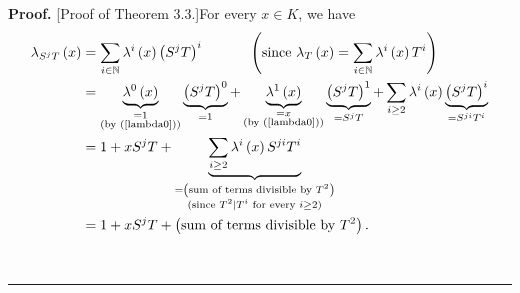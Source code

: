 \documentclass[numbers=enddot,12pt,final,onecolumn,notitlepage]{scrartcl}%
\newenvironment{proof}[1][Proof]{\noindent\textbf{#1.} }{\ \rule{0.5em}{0.5em}}
\begin{document}
\begin{proof}
[Proof of Theorem 3.3.]For every $x\in K$, we have
\begin{align}
\lambda_{S^{j}T}\left(  x\right)   &  =\sum\limits_{i\in\mathbb{N}}\lambda
^{i}\left(  x\right)  \left(  S^{j}T\right)  ^{i}\ \ \ \ \ \ \ \ \ \ \left(
\text{since }\lambda_{T}\left(  x\right)  =\sum\limits_{i\in\mathbb{N}}%
\lambda^{i}\left(  x\right)  T^{i}\right) \nonumber\\
&  =\underbrace{\lambda^{0}\left(  x\right)  }_{\substack{=1\\\text{(by
(\ref{lambda0}))}}}\underbrace{\left(  S^{j}T\right)  ^{0}}_{=1}%
+\underbrace{\lambda^{1}\left(  x\right)  }_{\substack{=x\\\text{(by
(\ref{lambda0}))}}}\underbrace{\left(  S^{j}T\right)  ^{1}}_{=S^{j}T}%
+\sum\limits_{i\geq2}\lambda^{i}\left(  x\right)  \underbrace{\left(
S^{j}T\right)  ^{i}}_{=S^{ji}T^{i}}\nonumber\\
&  =1+xS^{j}T+\underbrace{\sum\limits_{i\geq2}\lambda^{i}\left(  x\right)
S^{ji}T^{i}}_{\substack{=\left(  \text{sum of terms divisible by }%
T^{2}\right)  \\\text{(since }T^{2}\mid T^{i}\text{ for every }i\geq2\text{)}%
}}\nonumber\\
&  =1+xS^{j}T+\left(  \text{sum of terms divisible by }T^{2}\right)  .
\label{thm.3.3.pf.1}%
\end{align}



\end{proof}
\end{document}

